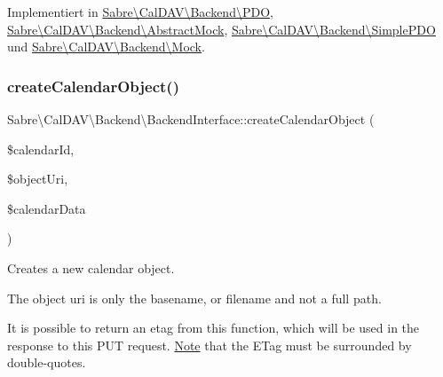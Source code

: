 Implementiert in \mbox{\hyperlink{class_sabre_1_1_cal_d_a_v_1_1_backend_1_1_p_d_o_a668ecafd32745afe1cee73954ab867f0}{Sabre\textbackslash{}\+Cal\+D\+A\+V\textbackslash{}\+Backend\textbackslash{}\+P\+DO}}, \mbox{\hyperlink{class_sabre_1_1_cal_d_a_v_1_1_backend_1_1_abstract_mock_af3c77f7cc777eb7a101be58d96bf6d85}{Sabre\textbackslash{}\+Cal\+D\+A\+V\textbackslash{}\+Backend\textbackslash{}\+Abstract\+Mock}}, \mbox{\hyperlink{class_sabre_1_1_cal_d_a_v_1_1_backend_1_1_simple_p_d_o_ae765390abf75b7111396a55e13fa965f}{Sabre\textbackslash{}\+Cal\+D\+A\+V\textbackslash{}\+Backend\textbackslash{}\+Simple\+P\+DO}} und \mbox{\hyperlink{class_sabre_1_1_cal_d_a_v_1_1_backend_1_1_mock_adbaaeee2f6d41b5cc388f2935a42e90d}{Sabre\textbackslash{}\+Cal\+D\+A\+V\textbackslash{}\+Backend\textbackslash{}\+Mock}}.

\mbox{\label{interface_sabre_1_1_cal_d_a_v_1_1_backend_1_1_backend_interface_a338ac93ff39e5ed7a9330df875b9efa4}} 
\subsubsection{\texorpdfstring{create\+Calendar\+Object()}{createCalendarObject()}}
{\footnotesize\ttfamily Sabre\textbackslash{}\+Cal\+D\+A\+V\textbackslash{}\+Backend\textbackslash{}\+Backend\+Interface\+::create\+Calendar\+Object (\begin{DoxyParamCaption}\item[{}]{\$calendar\+Id,  }\item[{}]{\$object\+Uri,  }\item[{}]{\$calendar\+Data }\end{DoxyParamCaption})}

Creates a new calendar object.

The object uri is only the basename, or filename and not a full path.

It is possible to return an etag from this function, which will be used in the response to this P\+UT request. \mbox{\hyperlink{class_note}{Note}} that the E\+Tag must be surrounded by double-\/quotes.

